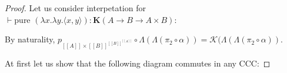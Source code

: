 \documentclass[a4paper]{article}
\begin{document}
\begin{proof}
Let us consider interpetation for $\vdash \text{pure } (\lambda x. \lambda y. \langle x, y \rangle) :
\textbf{K}(A \to B \to A \times B)$:
\begin{prooftree}
\end{prooftree}

By naturality, $p_{[\![A]\!] \times [\![B]\!]^{[\![B]\!]^{[\![A]\!]}}} \circ \Lambda(\Lambda(\pi_2 \circ
\alpha)) = \mathcal{K}(\Lambda(\Lambda(\pi_2 \circ \alpha))$.

At first let us show that the following diagram commutes in any CCC:

\vspace{\baselineskip}


\vspace{\baselineskip}


\end{proof}
\end{document}
